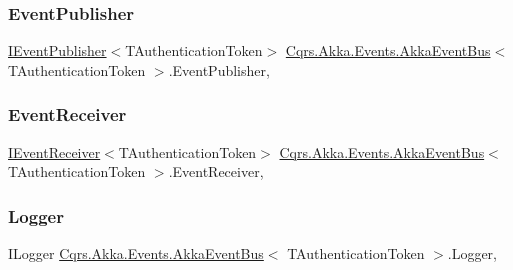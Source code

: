\subsubsection{\texorpdfstring{Event\+Publisher}{EventPublisher}}
{\footnotesize\ttfamily \hyperlink{interfaceCqrs_1_1Events_1_1IEventPublisher}{I\+Event\+Publisher}$<$T\+Authentication\+Token$>$ \hyperlink{classCqrs_1_1Akka_1_1Events_1_1AkkaEventBus}{Cqrs.\+Akka.\+Events.\+Akka\+Event\+Bus}$<$ T\+Authentication\+Token $>$.Event\+Publisher\hspace{0.3cm}{\ttfamily [get]}, {\ttfamily [protected]}}

\mbox{\label{classCqrs_1_1Akka_1_1Events_1_1AkkaEventBus_a8e2deeb33b6c6cbc59bec0e0786d5b71_a8e2deeb33b6c6cbc59bec0e0786d5b71}} 
\subsubsection{\texorpdfstring{Event\+Receiver}{EventReceiver}}
{\footnotesize\ttfamily \hyperlink{interfaceCqrs_1_1Events_1_1IEventReceiver}{I\+Event\+Receiver}$<$T\+Authentication\+Token$>$ \hyperlink{classCqrs_1_1Akka_1_1Events_1_1AkkaEventBus}{Cqrs.\+Akka.\+Events.\+Akka\+Event\+Bus}$<$ T\+Authentication\+Token $>$.Event\+Receiver\hspace{0.3cm}{\ttfamily [get]}, {\ttfamily [protected]}}

\mbox{\label{classCqrs_1_1Akka_1_1Events_1_1AkkaEventBus_a0bbdde7f2011707581db6a66cd73c5c4_a0bbdde7f2011707581db6a66cd73c5c4}} 
\subsubsection{\texorpdfstring{Logger}{Logger}}
{\footnotesize\ttfamily I\+Logger \hyperlink{classCqrs_1_1Akka_1_1Events_1_1AkkaEventBus}{Cqrs.\+Akka.\+Events.\+Akka\+Event\+Bus}$<$ T\+Authentication\+Token $>$.Logger\hspace{0.3cm}{\ttfamily [get]}, {\ttfamily [protected]}}

